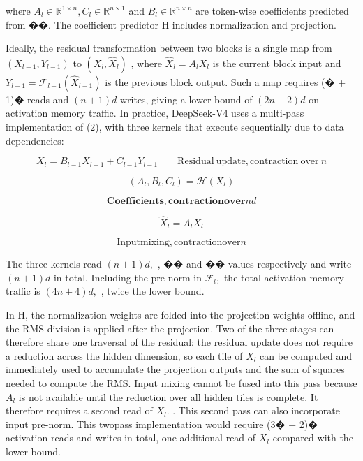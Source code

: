\documentclass[
  10
]{article}
\begin{document}
where
\(A _ { l } \in \mathbb { R } ^ { 1 \times n } , C _ { l } \in \mathbb { R } ^ { n \times 1 }\)
and \(B _ { l } \in \mathbb { R } ^ { n \times n }\) are token-wise
coefficients predicted from ��. The coefficient predictor H includes
normalization and projection.

Ideally, the residual transformation between two blocks is a single map
from \(\left( X _ { l - 1 } , Y _ { l - 1 } \right)\) to
\(( X _ { l } , \hat { X } _ { l } )\) , where
\(\hat { X } _ { l } = A _ { l } X _ { l }\) is the current block input
and
\(Y _ { l - 1 } = \mathcal { F } _ { l - 1 } ( \hat { X } _ { l - 1 } )\)
is the previous block output. Such a map requires (� + 1)� reads and
\(( n + 1 ) d\) writes, giving a lower bound of \(( 2 n + 2 ) d\) on
activation memory traffic. In practice, DeepSeek-V4 uses a multi-pass
implementation of (2), with three kernels that execute sequentially due
to data dependencies:

\[
X _ { l } = B _ { l - 1 } X _ { l - 1 } + C _ { l - 1 } Y _ { l - 1 } \qquad { \mathrm { R e s i d u a l ~ u p d a t e , c o n t r a c t i o n ~ o v e r ~ } } n\tag{3}
\]

\[
\left( A _ { l } , B _ { l } , C _ { l } \right) = \mathcal { H } ( X _ { l } )
\]

\[
\mathbf { C o e f f i c i e n t s , c o n t r a c t i o n o v e r } n d\tag{4}
\]

\[
\hat { X } _ { l } = A _ { l } X _ { l }
\]

\[
{ \mathrm { I n p u t m i x i n g } } , { \mathrm { c o n t r a c t i o n o v e r } } n\tag{5}
\]

The three kernels read \(( n + 1 ) d ,\) , �� and �� values respectively
and write \(( n + 1 ) d\) in total. Including the pre-norm in
\(\mathcal { F } _ { l } ,\) the total activation memory traffic is
\(( 4 n + 4 ) d ,\) , twice the lower bound.

In H, the normalization weights are folded into the projection weights
offline, and the RMS division is applied after the projection. Two of
the three stages can therefore share one traversal of the residual: the
residual update does not require a reduction across the hidden
dimension, so each tile of \(X _ { l }\) can be computed and immediately
used to accumulate the projection outputs and the sum of squares needed
to compute the RMS. Input mixing cannot be fused into this pass because
\(A _ { l }\) is not available until the reduction over all hidden tiles
is complete. It therefore requires a second read of \(X _ { l } .\) .
This second pass can also incorporate input pre-norm. This twopass
implementation would require (3� + 2)� activation reads and writes in
total, one additional read of \(X _ { l }\) compared with the lower
bound.
\end{document}
